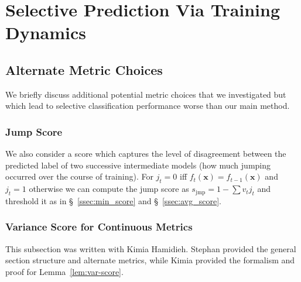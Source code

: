 \chapter{Selective Prediction Via Training Dynamics}

\section{Alternate Metric Choices}
\label{sec:alt_scores}

We briefly discuss additional potential metric choices that we investigated but which lead to selective classification performance worse than our main method.

\subsection{Jump Score \sjmp} We also consider a score which captures the level of disagreement between the predicted label of two successive intermediate models (\ie how much jumping occurred over the course of training). For $j_t = 0$ iff $f_{t}(\bm{x}) = f_{t-1}(\bm{x})$ and $j_t = 1$ otherwise we can compute the jump score as $s_\text{jmp} = 1 - \sum v_t j_t$ and threshold it as in \S~\ref{ssec:min_score} and \S~\ref{ssec:avg_score}. 

\subsection{Variance Score \svar for Continuous Metrics}

\begin{contriback}
This subsection was written with Kimia Hamidieh. Stephan provided the general section structure and alternate metrics, while Kimia provided the formalism and proof for Lemma~\ref{lem:var-score}.
\end{contriback}


